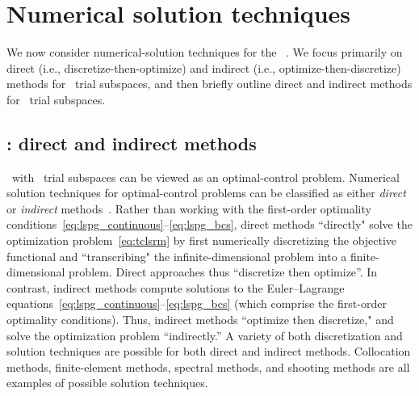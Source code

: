 \section{Numerical solution techniques}\label{sec:numerical_techniques}
We now consider numerical-solution techniques for the \methodAcronym\ \approachKwd.
We focus primarily on 
direct (i.e., discretize-then-optimize) and indirect (i.e., optimize-then-discretize) methods for \spatialAcronym\ trial subspaces, 
and then briefly outline direct and indirect methods for \spaceTimeAcronym\ trial subspaces. 
\subsection{\spatialAcronym: direct and indirect methods}
\methodAcronym\ with \spatialAcronym\ trial subspaces can be viewed as an optimal-control problem.
Numerical solution techniques for
optimal-control problems can be classified as either
\textit{direct} or \textit{indirect}
methods~\cite{conway_optimalcontrolreview}. Rather than working with the first-order optimality conditions~\eqref{eq:lspg_continuous}--\eqref{eq:lspg_bcs}, direct methods ``directly" solve the optimization problem~\eqref{eq:tclsrm} by first
numerically discretizing the objective functional and ``transcribing"
the infinite-dimensional problem into a finite-dimensional 
problem. Direct approaches thus
``discretize then optimize''. 
In contrast, indirect methods compute solutions to the Euler--Lagrange
equations~\eqref{eq:lspg_continuous}--\eqref{eq:lspg_bcs} (which comprise the
first-order optimality conditions). Thus, indirect methods
``optimize then discretize," and solve the optimization problem
``indirectly.'' A variety of both discretization and solution techniques are possible
for both direct and indirect methods. Collocation methods,
finite-element methods, spectral methods, and shooting methods are all examples of
possible solution techniques.  

